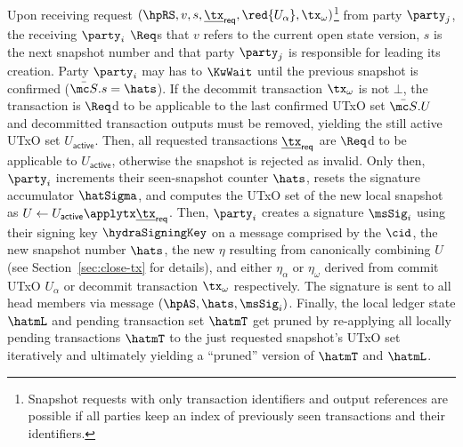 \quad Upon receiving request
$(\hpRS,v,s,\underline{\tx}_{\mathsf{req}}, \red{U_\alpha}, \tx_\omega)$\footnote{Snapshot
  requests with only transaction identifiers and output references are possible
  if all parties keep an index of previously seen transactions and their
  identifiers.} from party $\party_j$, the receiving $\party_i$ $\Req$s
 that $v$ refers
to the current open state version, $s$ is the next snapshot number and that
party $\party_j$ is responsible for leading its creation.
Party $\party_i$ may has to $\KwWait$ until the previous snapshot is confirmed
($\bar{\mc S}.s = \hats$). If the decommit transaction $\tx_{\omega}$ is not $\bot$, the
transaction is $\Req$d to be applicable to the last confirmed UTxO set
$\bar{\mc S}.U$ and decommitted transaction outputs must be removed, yielding
the still active UTxO set $U_{\mathsf{active}}$. Then, all requested
transactions $\underline{\tx}_{\mathsf{req}}$ are $\Req$d to be applicable to
$U_{\mathsf{active}}$, otherwise the snapshot is rejected as invalid. Only then,
$\party_i$ increments their seen-snapshot counter $\hats$, resets the signature
accumulator $\hatSigma$, and computes the UTxO set of the new local snapshot as
$U \gets U_{\mathsf{active}} \applytx \underline{\tx}_{\mathsf{req}}$. Then,
$\party_i$ creates a signature $\msSig_i$ using their signing key
$\hydraSigningKey$ on a message comprised by the $\cid$, the new snapshot number
$\hats$, the new $\eta$ resulting from canonically combining $U$ (see
Section~\ref{sec:close-tx} for details), and either $\eta_{\alpha}$ or $\eta_{\omega}$ derived
from commit UTxO $U_{\alpha}$ or decommit transaction $\tx_{\omega}$ respectively. The
signature is sent to all head members via message $(\hpAS,\hats,\msSig_i)$.
Finally, the local ledger state $\hatmL$ and pending transaction set $\hatmT$
get pruned by re-applying all locally pending transactions $\hatmT$ to the just
requested snapshot's UTxO set iteratively and
ultimately yielding a ``pruned'' version of $\hatmT$ and $\hatmL$. \\

